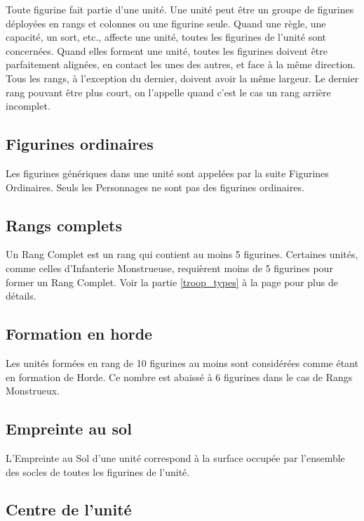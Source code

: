Toute figurine fait partie d'une unité. Une unité peut être un groupe de figurines déployées en rangs et colonnes ou une figurine seule. Quand une règle, une capacité, un sort, etc., affecte une unité, toutes les figurines de l'unité sont concernées. Quand elles forment une unité, toutes les figurines doivent être parfaitement alignées, en contact les unes des autres, et face à la même direction. Tous les rangs, à l'exception du dernier, doivent avoir la même largeur. Le dernier rang pouvant être plus court, on l'appelle quand c'est le cas un rang arrière incomplet. 

\subsection{Figurines ordinaires}

Les figurines génériques dans une unité sont appelées par la suite Figurines Ordinaires. Seuls les Personnages ne sont pas des figurines ordinaires.

\subsection{Rangs complets}

Un Rang Complet est un rang qui contient au moins 5 figurines. Certaines unités, comme celles d'Infanterie Monstrueuse, requièrent moins de 5 figurines pour former un Rang Complet. Voir la partie \ref{troop_types} à la page \pageref{troop_types} pour plus de détails.

\subsection{Formation en horde}
\label{horde}

Les unités formées en rang de 10 figurines au moins sont considérées comme étant en formation de Horde. Ce nombre est abaissé à 6 figurines dans le cas de Rangs Monstrueux.

\subsection{Empreinte au sol}

L'Empreinte au Sol d'une unité correspond à la surface occupée par l'ensemble des socles de toutes les figurines de l'unité.

\subsection{Centre de l'unité}
\label{centre_unite}

